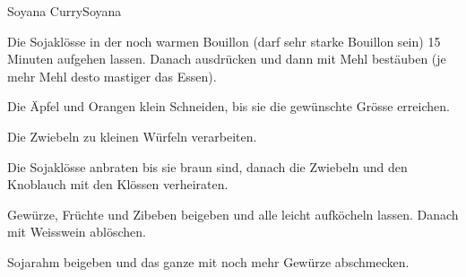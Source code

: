 
\begin{recipe}[]{Soyana Curry}{Soyana}{}




\step%
Die Sojakl\"osse in der noch warmen Bouillon (darf sehr starke Bouillon sein)
15 Minuten aufgehen lassen. Danach ausdr\"ucken und dann mit Mehl best\"auben
(je mehr Mehl desto mastiger das Essen).

\step%
Die \"Apfel und Orangen klein Schneiden, bis sie die gew\"unschte Gr\"osse
erreichen.

\step%
Die Zwiebeln zu kleinen W\"urfeln verarbeiten.

\step%
Die Sojakl\"osse anbraten bis sie braun sind, danach die Zwiebeln und den
Knoblauch mit den Kl\"ossen verheiraten.

\step%
Gew\"urze, Fr\"uchte und Zibeben beigeben und alle leicht aufk\"ocheln lassen.
Danach mit Weisswein abl\"oschen.

\step%
Sojarahm beigeben und das ganze mit noch mehr Gew\"urze abschmecken.


\end{recipe}
